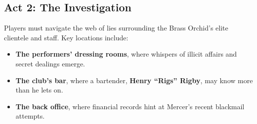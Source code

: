 \subsection{Act 2: The Investigation} 

Players must navigate the web of lies surrounding the Brass Orchid’s elite clientele and staff. Key locations include:
\begin{WyrdExplanation}
	\begin{itemize}
		\item \textbf{The performers’ dressing rooms}, where whispers of illicit affairs and secret dealings emerge.
		\item \textbf{The club’s bar}, where a bartender, \textbf{Henry ``Rigs'' Rigby}, may know more than he lets on.
		\item \textbf{The back office}, where financial records hint at Mercer’s recent blackmail attempts.
	\end{itemize}
\end{WyrdExplanation}

